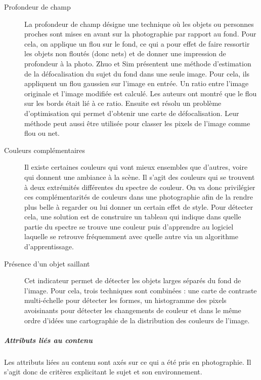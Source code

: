 \documentclass[11pt, french]{report-rd-info}
\begin{document}
\begin{description}
\item[Profondeur de champ]
La profondeur de champ désigne une technique où les objets ou personnes proches sont mises en avant sur la photographie par rapport au fond. Pour cela, on applique un flou sur  le fond, ce qui a pour effet de faire ressortir les objets non floutés (donc nets) et de donner une impression de profondeur à la photo. Zhuo et Sim \cite{Zhuo2011} présentent une méthode d’estimation de la défocalisation du sujet du fond dans une seule image. Pour cela, ils appliquent un flou gaussien sur l’image en  entrée. Un ratio entre l’image originale et l’image modifiée est calculé. Les auteurs ont montré que le flou sur les bords était lié à ce ratio. Ensuite est résolu un problème d’optimisation qui permet d’obtenir une carte de défocalisation. Leur méthode peut aussi être utilisée pour classer les pixels de l’image comme flou ou net.
\item[Couleurs complémentaires]
Il existe certaines couleurs qui vont mieux ensembles que d’autres, voire qui donnent une ambiance à la scène. Il s’agit des couleurs qui se trouvent à deux extrémités différentes du spectre de couleur. On va donc privilégier ces complémentarités de couleurs dans une photographie afin de la rendre plus belle à regarder ou lui donner un certain effet de style. Pour détecter cela, une solution est de construire un tableau  qui indique dans quelle partie du spectre se trouve une couleur puis d’apprendre au logiciel laquelle se retrouve fréquemment  avec quelle autre via un algorithme d’apprentissage.
\item[Présence d'un objet saillant]
Cet indicateur permet de détecter les objets larges séparés du fond de l’image. Pour cela, trois techniques sont combinées : une carte de contraste multi-échelle pour détecter les formes, un histogramme des pixels avoisinants pour détecter les changements de couleur et dans le même ordre d’idées une cartographie de la distribution des couleurs de l’image.
\end{description}
\subparagraph{Attributs liés au contenu}
Les attributs liées au contenu sont axés sur ce qui a été pris en photographie. Il s'agit donc de critères explicitant le sujet et son environnement.
\end{document}

